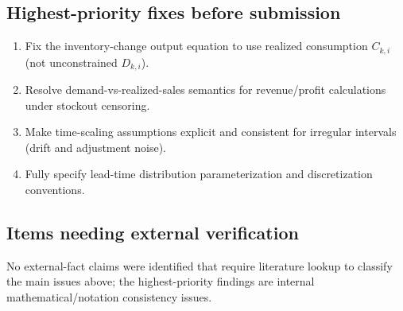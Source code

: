 \documentclass[11pt]{article}
\begin{document}
\subsection*{Highest-priority fixes before submission}
\begin{enumerate}[leftmargin=*]
\item Fix the inventory-change output equation to use realized consumption $C_{k,i}$ (not unconstrained $D_{k,i}$).
\item Resolve demand-vs-realized-sales semantics for revenue/profit calculations under stockout censoring.
\item Make time-scaling assumptions explicit and consistent for irregular intervals (drift and adjustment noise).
\item Fully specify lead-time distribution parameterization and discretization conventions.
\end{enumerate}

\subsection*{Items needing external verification}
No external-fact claims were identified that require literature lookup to classify the main issues above; the highest-priority findings are internal mathematical/notation consistency issues.
\end{document}
